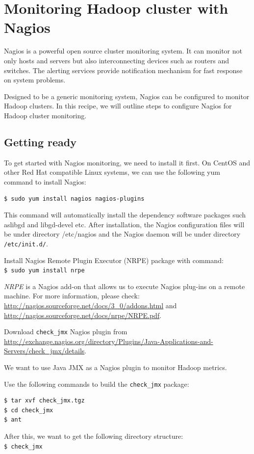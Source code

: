 \section{Monitoring Hadoop cluster with Nagios}
Nagios is a powerful open source cluster monitoring system. It can monitor not only hosts and servers but also interconnecting devices such as routers and switches. The alerting services provide notification mechanism for fast response on system problems.

Designed to be a generic monitoring system, Nagios can be configured to monitor Hadoop clusters. In this recipe, we will outline steps to configure Nagios for Hadoop cluster monitoring.
\subsection*{Getting ready}
To get started with Nagios monitoring, we need to install it first. On CentOS and other Red Hat compatible Linux systems, we can use the following yum command to install Nagios:

\verb|$ sudo yum install nagios nagios-plugins|

This command will automatically install the dependency software packages such aslibgd and libgd-devel etc. After installation, the Nagios configuration files will be under directory /etc/nagios and the Nagios daemon will be under directory \verb|/etc/init.d/|.

Install Nagios Remote Plugin Executor (NRPE) package with command:\\
\verb|$ sudo yum install nrpe|

\emph{NRPE} is a Nagios add-on that allows us to execute Nagios plug-ins on a remote machine. For more information, please check: \url{http://nagios.sourceforge.net/docs/3_0/addons.html} and \url{http://nagios.sourceforge.net/docs/nrpe/NRPE.pdf}.

Download \verb|check_jmx| Nagios plugin from \url{http://exchange.nagios.org/directory/Plugins/Java-Applications-and-Servers/check_jmx/details}.

We want to use Java JMX as a Nagios plugin to monitor Hadoop metrics.

Use the following commands to build the \verb|check_jmx| package:
\lstset{style=bashstyle}
\begin{lstlisting}[language=bash]
$ tar xvf check_jmx.tgz
$ cd check_jmx
$ ant
\end{lstlisting}

After this, we want to get the following directory structure:\\
\verb|$ check_jmx|

